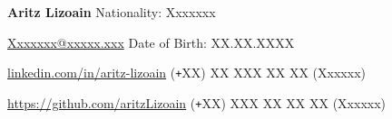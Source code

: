 \documentclass{resume}
\makeatletter
\def\Plus{\texttt{+}}
\newcommand*{\Authoremail}{Xxxxxxx@xxxxx.xxx}
\makeatother
\begin{document}
\sloppy

\vspace{-1.05in}
\textbf{\LARGE{Aritz Lizoain}} \hspace*{84pt} Nationality: Xxxxxxx 

\href{mailto:\Authoremail}{ \Authoremail} \hspace*{70pt} Date of Birth: XX.XX.XXXX 

{\href{https://linkedin.com/in/aritz-lizoain}{ linkedin.com/in/aritz-lizoain}} \hspace*{46pt}  (\Plus XX) XX XXX XX XX (Xxxxxx)

{\href{https://github.com/aritzLizoain}{ https://github.com/aritzLizoain}} \hspace*{35.5pt}  (\Plus XX) XXX XX XX XX (Xxxxxx)  

\vspace*{-20pt}
  

\vspace{12pt}
\end{document}
